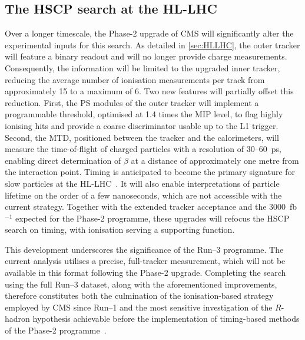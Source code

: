 \subsection{The HSCP search at the HL-LHC}

Over a longer timescale, the Phase-2 upgrade of CMS will significantly alter the experimental inputs for this search. As detailed in \cref{sec:HLLHC}, the outer tracker will feature a binary readout and will no longer provide charge measurements. Consequently, the \dedx{} information will be limited to the upgraded inner tracker, reducing the average number of ionisation measurements per track from approximately 15 to a maximum of 6. Two new features will partially offset this reduction. First, the PS modules of the outer tracker will implement a programmable threshold, optimised at 1.4 times the MIP level, to flag highly ionising hits and provide a coarse \dedx{} discriminator usable up to the L1 trigger. Second, the MTD, positioned between the tracker and the calorimeters, will measure the time-of-flight of charged particles with a resolution of 30--60~ps, enabling direct determination of $\beta$ at a distance of approximately one metre from the interaction point. Timing is anticipated to become the primary signature for slow particles at the HL-LHC~\cite{CMS:2667167, CMS-DP-2022-025}. It will also enable interpretations of particle lifetime on the order of a few nanoseconds, which are not accessible with the current strategy. Together with the extended tracker acceptance and the $3000$~fb$^{-1}$ expected for the Phase-2 programme, these upgrades will refocus the HSCP search on timing, with ionisation serving a supporting function.

This development underscores the significance of the Run--3 programme. The current analysis utilises a precise, full-tracker \dedx{} measurement, which will not be available in this format following the Phase-2 upgrade. Completing the search using the full Run--3 dataset, along with the aforementioned improvements, therefore constitutes both the culmination of the ionisation-based strategy employed by CMS since Run--1 and the most sensitive investigation of the $R$-hadron hypothesis achievable before the implementation of timing-based methods of the Phase-2 programme~\cite{CMS-DP-2022-025}.